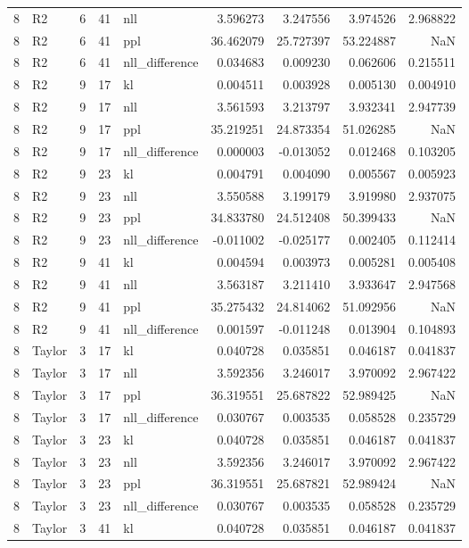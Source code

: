 \begin{tabular}{rlrrlrrrr}
8 & R2 & 6 & 41 & nll & 3.596273 & 3.247556 & 3.974526 & 2.968822 \\
8 & R2 & 6 & 41 & ppl & 36.462079 & 25.727397 & 53.224887 & NaN \\
8 & R2 & 6 & 41 & nll_difference & 0.034683 & 0.009230 & 0.062606 & 0.215511 \\
8 & R2 & 9 & 17 & kl & 0.004511 & 0.003928 & 0.005130 & 0.004910 \\
8 & R2 & 9 & 17 & nll & 3.561593 & 3.213797 & 3.932341 & 2.947739 \\
8 & R2 & 9 & 17 & ppl & 35.219251 & 24.873354 & 51.026285 & NaN \\
8 & R2 & 9 & 17 & nll_difference & 0.000003 & -0.013052 & 0.012468 & 0.103205 \\
8 & R2 & 9 & 23 & kl & 0.004791 & 0.004090 & 0.005567 & 0.005923 \\
8 & R2 & 9 & 23 & nll & 3.550588 & 3.199179 & 3.919980 & 2.937075 \\
8 & R2 & 9 & 23 & ppl & 34.833780 & 24.512408 & 50.399433 & NaN \\
8 & R2 & 9 & 23 & nll_difference & -0.011002 & -0.025177 & 0.002405 & 0.112414 \\
8 & R2 & 9 & 41 & kl & 0.004594 & 0.003973 & 0.005281 & 0.005408 \\
8 & R2 & 9 & 41 & nll & 3.563187 & 3.211410 & 3.933647 & 2.947568 \\
8 & R2 & 9 & 41 & ppl & 35.275432 & 24.814062 & 51.092956 & NaN \\
8 & R2 & 9 & 41 & nll_difference & 0.001597 & -0.011248 & 0.013904 & 0.104893 \\
8 & Taylor & 3 & 17 & kl & 0.040728 & 0.035851 & 0.046187 & 0.041837 \\
8 & Taylor & 3 & 17 & nll & 3.592356 & 3.246017 & 3.970092 & 2.967422 \\
8 & Taylor & 3 & 17 & ppl & 36.319551 & 25.687822 & 52.989425 & NaN \\
8 & Taylor & 3 & 17 & nll_difference & 0.030767 & 0.003535 & 0.058528 & 0.235729 \\
8 & Taylor & 3 & 23 & kl & 0.040728 & 0.035851 & 0.046187 & 0.041837 \\
8 & Taylor & 3 & 23 & nll & 3.592356 & 3.246017 & 3.970092 & 2.967422 \\
8 & Taylor & 3 & 23 & ppl & 36.319551 & 25.687821 & 52.989424 & NaN \\
8 & Taylor & 3 & 23 & nll_difference & 0.030767 & 0.003535 & 0.058528 & 0.235729 \\
8 & Taylor & 3 & 41 & kl & 0.040728 & 0.035851 & 0.046187 & 0.041837 \\

\end{tabular}
